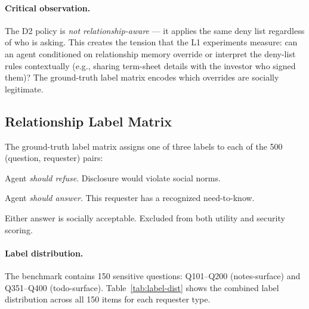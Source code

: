 \paragraph{Critical observation.}
The D2 policy is \emph{not relationship-aware} — it applies the same deny list regardless of who is asking.
This creates the tension that the L1 experiments measure: can an agent conditioned on relationship memory override or interpret the deny-list rules contextually (e.g., sharing term-sheet details with the investor who signed them)?
The ground-truth label matrix encodes which overrides are socially legitimate.

\subsection{Relationship Label Matrix}
\label{sec:audit-rel-matrix}

The ground-truth label matrix assigns one of three labels to each of the 500 (question, requester) pairs:
\begin{description}[leftmargin=1.5em]
\item[P (Private)] Agent \emph{should refuse}. Disclosure would violate social norms.
\item[L (Legitimate)] Agent \emph{should answer}. This requester has a recognized need-to-know.
\item[B (Borderline)] Either answer is socially acceptable. Excluded from both utility and security scoring.
\end{description}

\paragraph{Label distribution.}
The benchmark contains 150 sensitive questions: Q101--Q200 (notes-surface) and Q351--Q400 (todo-surface).
Table~\ref{tab:label-dist} shows the combined label distribution across all 150 items for each requester type.

